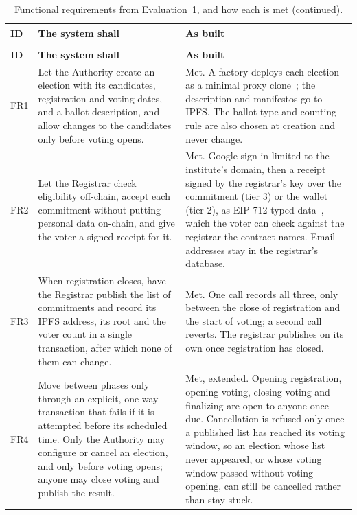 \begin{longtable}{@{}>{\RaggedRight\arraybackslash\small}p{1.0cm}>{\RaggedRight\arraybackslash\small}p{7.0cm}>{\RaggedRight\arraybackslash\small}p{9.3cm}@{}}
  \caption{Functional requirements from Evaluation~1, and how each is met.}\label{tab:fr}\\
  \toprule
  \textbf{ID} & \textbf{The system shall} & \textbf{As built} \\
  \midrule
  \endfirsthead
  \caption[]{Functional requirements from Evaluation~1, and how each is met (continued).}\\
  \toprule
  \textbf{ID} & \textbf{The system shall} & \textbf{As built} \\
  \midrule
  \endhead
  \bottomrule
  \endlastfoot
  FR1 & Let the Authority create an election with its candidates, registration and voting dates, and a ballot description, and allow changes to the candidates only before voting opens. & Met. A factory deploys each election as a minimal proxy clone~\cite{eip1167}; the description and manifestos go to IPFS. The ballot type and counting rule are also chosen at creation and never change. \\
  \addlinespace[2pt]
  FR2 & Let the Registrar check eligibility off-chain, accept each commitment without putting personal data on-chain, and give the voter a signed receipt for it. & Met. Google sign-in limited to the institute's domain, then a receipt signed by the registrar's key over the commitment (tier 3) or the wallet (tier 2), as EIP-712 typed data~\cite{eip712}, which the voter can check against the registrar the contract names. Email addresses stay in the registrar's database. \\
  \addlinespace[2pt]
  FR3 & When registration closes, have the Registrar publish the list of commitments and record its IPFS address, its root and the voter count in a single transaction, after which none of them can change. & Met. One call records all three, only between the close of registration and the start of voting; a second call reverts. The registrar publishes on its own once registration has closed. \\
  \addlinespace[2pt]
  FR4 & Move between phases only through an explicit, one-way transaction that fails if it is attempted before its scheduled time. Only the Authority may configure or cancel an election, and only before voting opens; anyone may close voting and publish the result. & Met, extended. Opening registration, opening voting, closing voting and finalizing are open to anyone once due. Cancellation is refused only once a published list has reached its voting window, so an election whose list never appeared, or whose voting window passed without voting opening, can still be cancelled rather than stay stuck. \\

\end{longtable}
